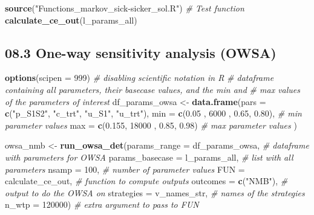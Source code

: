 \documentclass[
]{article}
\newenvironment{Shaded}{\begin{snugshade}}{\end{snugshade}}
\newcommand{\CommentTok}[1]{\textcolor[rgb]{0.56,0.35,0.01}{\textit{#1}}}
\newcommand{\DataTypeTok}[1]{\textcolor[rgb]{0.13,0.29,0.53}{#1}}
\newcommand{\DecValTok}[1]{\textcolor[rgb]{0.00,0.00,0.81}{#1}}
\newcommand{\FloatTok}[1]{\textcolor[rgb]{0.00,0.00,0.81}{#1}}
\newcommand{\KeywordTok}[1]{\textcolor[rgb]{0.13,0.29,0.53}{\textbf{#1}}}
\newcommand{\NormalTok}[1]{#1}
\newcommand{\StringTok}[1]{\textcolor[rgb]{0.31,0.60,0.02}{#1}}
\begin{document}
\begin{Shaded}
\begin{Highlighting}[]
\KeywordTok{source}\NormalTok{(}\StringTok{"Functions_markov_sick-sicker_sol.R"}\NormalTok{)}
\CommentTok{# Test function}
\KeywordTok{calculate_ce_out}\NormalTok{(l_params_all)}
\end{Highlighting}
\end{Shaded}

\hypertarget{one-way-sensitivity-analysis-owsa}{%
\subsection{08.3 One-way sensitivity analysis
(OWSA)}\label{one-way-sensitivity-analysis-owsa}}

\begin{Shaded}
\begin{Highlighting}[]
\KeywordTok{options}\NormalTok{(}\DataTypeTok{scipen =} \DecValTok{999}\NormalTok{) }\CommentTok{# disabling scientific notation in R}
\CommentTok{# dataframe containing all parameters, their basecase values, and the min and }
\CommentTok{# max values of the parameters of interest }
\NormalTok{df_params_owsa <-}\StringTok{ }\KeywordTok{data.frame}\NormalTok{(}\DataTypeTok{pars =} \KeywordTok{c}\NormalTok{(}\StringTok{"p_S1S2"}\NormalTok{, }\StringTok{"c_trt"}\NormalTok{, }\StringTok{"u_S1"}\NormalTok{, }\StringTok{"u_trt"}\NormalTok{),}
                             \DataTypeTok{min  =} \KeywordTok{c}\NormalTok{(}\FloatTok{0.05}\NormalTok{ ,  }\DecValTok{6000}\NormalTok{ , }\FloatTok{0.65}\NormalTok{, }\FloatTok{0.80}\NormalTok{),  }\CommentTok{# min parameter values}
                             \DataTypeTok{max  =} \KeywordTok{c}\NormalTok{(}\FloatTok{0.155}\NormalTok{, }\DecValTok{18000}\NormalTok{ , }\FloatTok{0.85}\NormalTok{, }\FloatTok{0.98}\NormalTok{)   }\CommentTok{# max parameter values}
\NormalTok{                             )}

\NormalTok{owsa_nmb  <-}\StringTok{ }\KeywordTok{run_owsa_det}\NormalTok{(}\DataTypeTok{params_range     =}\NormalTok{ df_params_owsa,    }\CommentTok{# dataframe with parameters for OWSA}
                          \DataTypeTok{params_basecase  =}\NormalTok{ l_params_all,      }\CommentTok{# list with all parameters}
                          \DataTypeTok{nsamp            =} \DecValTok{100}\NormalTok{,               }\CommentTok{# number of parameter values}
                          \DataTypeTok{FUN              =}\NormalTok{ calculate_ce_out,  }\CommentTok{# function to compute outputs}
                          \DataTypeTok{outcomes         =} \KeywordTok{c}\NormalTok{(}\StringTok{"NMB"}\NormalTok{),          }\CommentTok{# output to do the OWSA on}
                          \DataTypeTok{strategies       =}\NormalTok{ v_names_str,       }\CommentTok{# names of the strategies}
                          \DataTypeTok{n_wtp            =} \DecValTok{120000}\NormalTok{)            }\CommentTok{# extra argument to pass to FUN}
\end{Highlighting}
\end{Shaded}
\end{document}
